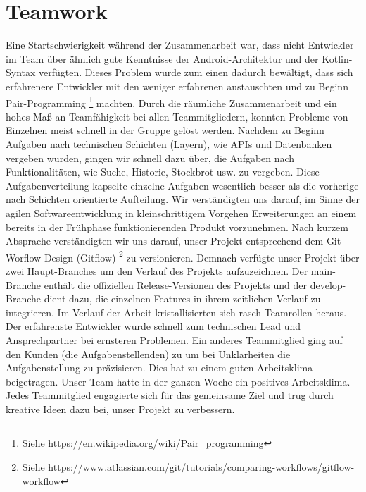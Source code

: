 \documentclass[a4paper]{article}
\begin{document}
\section{Teamwork}
\label{sec:teamwork}
Eine Startschwierigkeit während der Zusammenarbeit war, dass nicht Entwickler im Team über ähnlich gute Kenntnisse der Android-Architektur und der Kotlin-Syntax verfügten. Dieses Problem wurde zum einen dadurch bewältigt, dass sich erfahrenere Entwickler mit den weniger erfahrenen austauschten und zu Beginn Pair-Programming \footnote{Siehe \url{https://en.wikipedia.org/wiki/Pair_programming}} machten. Durch die räumliche Zusammenarbeit und ein hohes Maß an Teamfähigkeit bei allen Teammitgliedern, konnten Probleme von Einzelnen meist schnell in der Gruppe gelöst werden. Nachdem zu Beginn Aufgaben nach technischen Schichten (Layern), wie APIs und Datenbanken vergeben wurden, gingen wir schnell dazu über, die Aufgaben nach Funktionalitäten, wie Suche, Historie, Stockbrot usw. zu vergeben. Diese Aufgabenverteilung kapselte einzelne Aufgaben wesentlich besser als die vorherige nach Schichten orientierte Aufteilung. Wir verständigten uns darauf, im Sinne der agilen Softwareentwicklung in kleinschrittigem Vorgehen Erweiterungen an einem bereits in der Frühphase funktionierenden Produkt vorzunehmen. Nach kurzem Absprache verständigten wir uns darauf, unser Projekt entsprechend dem Git-Worflow Design (Gitflow) \footnote{Siehe \url{https://www.atlassian.com/git/tutorials/comparing-workflows/gitflow-workflow}} zu versionieren. Demnach verfügte unser Projekt über zwei Haupt-Branches um den Verlauf des Projekts aufzuzeichnen. Der main-Branche enthält die offiziellen Release-Versionen des Projekts und der develop-Branche dient dazu, die einzelnen Features in ihrem zeitlichen Verlauf zu integrieren. \newline
Im Verlauf der Arbeit kristallisierten sich rasch Teamrollen heraus. Der erfahrenste Entwickler wurde schnell zum technischen Lead und Ansprechpartner bei ernsteren Problemen. Ein anderes Teammitglied ging auf den Kunden (die Aufgabenstellenden) zu um bei Unklarheiten die Aufgabenstellung zu präzisieren. Dies hat zu einem guten Arbeitsklima beigetragen. \newline
Unser Team hatte in der ganzen Woche ein positives Arbeitsklima. Jedes Teammitglied engagierte sich für das gemeinsame Ziel und trug durch kreative Ideen dazu bei, unser Projekt zu verbessern.
\end{document}
